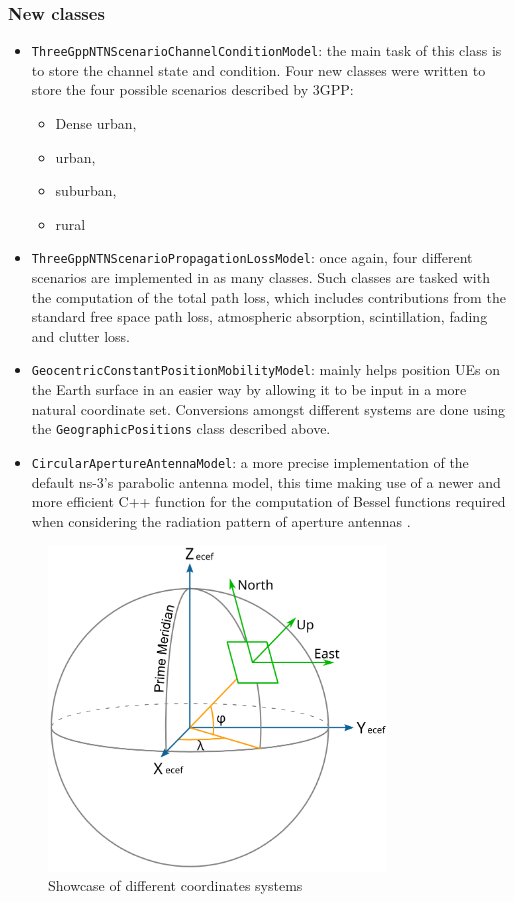 \subsubsection{New classes}
\begin{itemize}
    \item \texttt{ThreeGppNTNScenarioChannelConditionModel}: the main task of this class is to store the channel state and condition. Four new classes were written to store the four possible scenarios described by \ac{3GPP}:
    \begin{itemize}
        \item Dense urban,
        \item urban,
        \item suburban,
        \item rural
    \end{itemize}
    \item \texttt{ThreeGppNTNScenarioPropagationLossModel}: once again, four different scenarios are implemented in as many classes. Such classes are tasked with the computation of the total path loss, which includes contributions from the standard free space path loss, atmospheric absorption, scintillation, fading and clutter loss.
    \item \texttt{GeocentricConstantPositionMobilityModel}: mainly helps position \ac{UE}s on the Earth surface in an easier way by allowing it to be input in a more natural coordinate set. Conversions amongst different systems are done using the \texttt{GeographicPositions} class described above.
    \item \texttt{CircularApertureAntennaModel}: a more precise implementation of the default ns-3's parabolic antenna model, this time making use of a newer and more efficient C++ function for the computation of Bessel functions required when considering the radiation pattern of aperture antennas \cite{rad-patterns}.
\end{itemize}




\begin{figure}[ht]
    \centering
    \includegraphics[width=0.8\textwidth]{res/coord_systems.png}
    \caption{Showcase of different coordinates systems \cite{wiki_coords}}
    \label{fig:coord-syst}
\end{figure}

